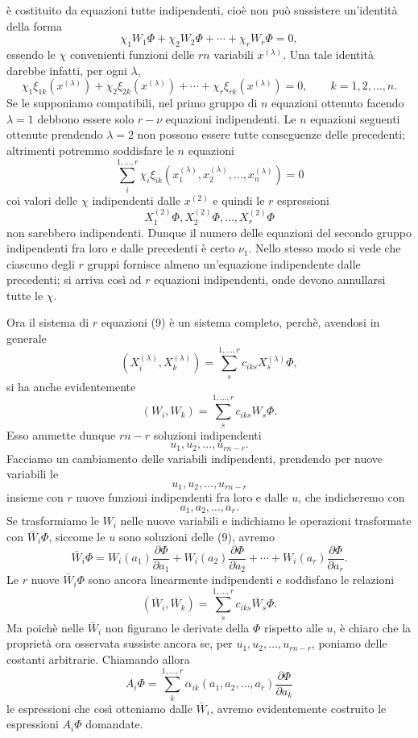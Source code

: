\documentclass[11pt]{book}
\begin{document}
è costituito da equazioni tutte indipendenti, cioè non può sussistere un'identità della forma
\[
 \chi_1W_1\Phi+\chi_2W_2\Phi+\cdots+\chi_rW_r\Phi=0,
\]
essendo le $\chi$ convenienti funzioni delle $rn$ variabili $x^{(\lambda)}$. Una tale identità darebbe infatti, per ogni $\lambda$,
\begin{equation*}\tag{10}
 \chi_1\xi_{1k}(x^{(\lambda)})+
 \chi_2\xi_{2k}(x^{(\lambda)})+
 \cdots+
 \chi_r\xi_{rk}(x^{(\lambda)})=0,
 \qquad k=1,2,\ldots,n.
\end{equation*}
Se le supponiamo compatibili, nel primo gruppo di $n$ equazioni ottenuto facendo $\lambda=1$ debbono essere solo $r-\nu$ equazioni indipendenti. Le $n$ equazioni seguenti ottenute prendendo $\lambda=2$ non possono essere tutte conseguenze delle precedenti; altrimenti potremmo soddisfare le $n$ equazioni
\[
 \sum\limits_i^{1,\ldots,r}\chi_i\xi_{ik}(x^{(\lambda)}_1,x^{(\lambda)}_2,\ldots,x^{(\lambda)}_n)=0
\]
coi valori delle $\chi$ indipendenti dalle $x^{(2)}$ e quindi le $r$ espressioni
\[
 X_1^{(2)}\Phi,
 X_2^{(2)}\Phi,
 \ldots,
 X_r^{(2)}\Phi
\]
non sarebbero indipendenti. Dunque il numero delle equazioni del secondo gruppo indipendenti fra loro e dalle precedenti è certo $\nu_1$. Nello stesso modo si vede che ciascuno degli $r$ gruppi fornisce almeno un'equazione indipendente dalle precedenti; si arriva così ad $r$ equazioni indipendenti, onde devono annullarsi tutte le $\chi$.

Ora il sistema di $r$ equazioni (9) è un sistema completo, perchè, avendosi in generale
\[
 (X_i^{(\lambda)},X_k^{(\lambda)})=\sum\limits_s^{1,\ldots,r}c_{iks}X_s^{(\lambda)}\Phi,
\]
si ha anche evidentemente
\[
 (W_i,W_k)=\sum\limits_s^{1,\ldots,r}c_{iks}W_s\Phi.
\]
Esso ammette dunque $rn-r$ soluzioni indipendenti
\[
 u_1,u_2,\ldots,u_{rn-r}.
\]
Facciamo un cambiamento delle variabili indipendenti, prendendo per nuove variabili le
\[
 u_1,u_2,\ldots,u_{rn-r}
\]
insieme con $r$ nuove funzioni indipendenti fra loro e dalle $u$, che indicheremo con
\[
 a_1,a_2,\ldots,a_r.
\]
Se trasformiamo le $W_i$ nelle nuove variabili e indichiamo le operazioni trasformate con $\bar W_i\Phi$, siccome le $u$ sono soluzioni delle (9), avremo
\[
 \bar W_i\Phi=
 W_i(a_1)\frac{\partial\Phi}{\partial a_1}+
 W_i(a_2)\frac{\partial\Phi}{\partial a_2}+\cdots+
 W_i(a_r)\frac{\partial\Phi}{\partial a_r}.
\]
Le $r$ nuove $\bar W_i\Phi$ sono ancora linearmente indipendenti e soddisfano le relazioni
\[
 (\bar W_i,\bar W_k)=\sum\limits_s^{1,\ldots,r}c_{iks}\bar W_s\Phi.
\]
Ma poichè nelle $\bar W_i$ non figurano le derivate della $\Phi$ rispetto alle $u$, è chiaro che la proprietà ora osservata sussiste ancora se, per $u_1,u_2,\ldots,u_{rn-r}$, poniamo delle costanti arbitrarie. Chiamando allora
\[
 A_i\Phi=\sum\limits_k^{1,\ldots,r}\alpha_{ik}(a_1,a_2,\ldots,a_r)\frac{\partial\Phi}{\partial a_k}
\]
le espressioni che così otteniamo dalle $\bar W_i$, avremo evidentemente costruito le espressioni $A_i\Phi$ domandate.
\end{document}
